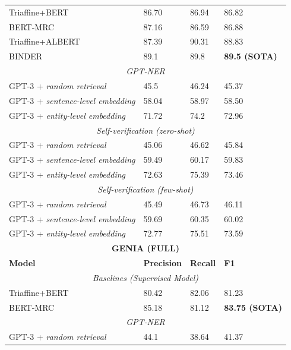 \documentclass[11pt]{article}
\begin{document}
\begin{table}[th!]
{\begin{tabular}{llll}
        Triaffine+BERT \citep{yuan2021fusing} & 86.70 & 86.94 & 86.82 \\
        BERT-MRC \citep{li2019unified} & 87.16 & 86.59 & 86.88 \\
        Triaffine+ALBERT \citep{yuan2021fusing} & 87.39 & 90.31 & 88.83 \\
        BINDER \citep{zhang2022optimizing} & 89.1 & 89.8 & \textbf{89.5 (SOTA)} \\\midrule
        \multicolumn{4}{c}{{\it GPT-NER}} \\\midrule
        GPT-3 + \textit{random retrieval} & 45.5 & 46.24 & 45.37 \\
        GPT-3 + \textit{sentence-level embedding} & 58.04 & 58.97 & 58.50 \\
        GPT-3 + \textit{entity-level embedding} & 71.72 & 74.2 & 72.96 \\\midrule
        \multicolumn{4}{c}{{\it Self-verification (zero-shot)}} \\\midrule
        GPT-3 + \textit{random retrieval} & 45.06 & 46.62 & 45.84 \\
        GPT-3 + \textit{sentence-level embedding} & 59.49 & 60.17 & 59.83 \\
        GPT-3 + \textit{entity-level embedding} & 72.63 & 75.39 & 73.46 \\\midrule
        \multicolumn{4}{c}{{\it Self-verification (few-shot)}} \\\midrule
        GPT-3 + \textit{random retrieval} & 45.49 & 46.73 & 46.11 \\
        GPT-3 + \textit{sentence-level embedding} & 59.69 & 60.35 & 60.02 \\
        GPT-3 + \textit{entity-level embedding} & 72.77 & 75.51 & 73.59 \\\midrule
        \multicolumn{4}{c}{{\bf GENIA (FULL)}} \\\midrule
        \textbf{Model} & \textbf{Precision} & \textbf{Recall} & \textbf{F1} \\\midrule
        \multicolumn{4}{c}{{\it Baselines (Supervised Model)}} \\\midrule
        Triaffine+BERT \citep{yuan2021fusing} & 80.42 & 82.06 & 81.23 \\
        BERT-MRC \citep{li2019unified} & 85.18 & 81.12 & \textbf{83.75 (SOTA)} \\\midrule
        \multicolumn{4}{c}{{\it GPT-NER}} \\\midrule
        GPT-3 + \textit{random retrieval} & 44.1 & 38.64 & 41.37 \\

\end{tabular}}
\end{table}
\end{document}
